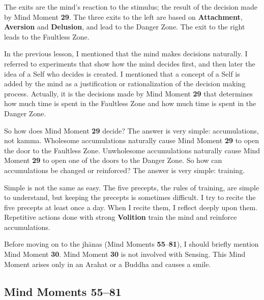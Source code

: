 The exits are the mind’s reaction to the stimulus; the result of the decision made by Mind Moment \textbf{29}. The three exits to the left are based on \textbf{Attachment}, \textbf{Aversion} and \textbf{Delusion}, and lead to the Danger Zone. The exit to the right leads to the Faultless Zone.

In the previous lesson, I mentioned that the mind makes decisions naturally. I referred to experiments that show how the mind decides first, and then later the idea of a Self who decides is created. I mentioned that a concept of a Self is added by the mind as a justification or rationalization of the decision making process. Actually, it is the decisions made by Mind Moment \textbf{29} that determines how much time is spent in the Faultless Zone and how much time is spent in the Danger Zone.

So how does Mind Moment \textbf{29} decide? The answer is very simple: accumulations, not kamma. Wholesome accumulations naturally cause Mind Moment \textbf{29} to open the door to the Faultless Zone. Unwholesome accumulations naturally cause Mind Moment \textbf{29} to open one of the doors to the Danger Zone. So how can accumulations be changed or reinforced? The answer is very simple: training.

Simple is not the same as easy. The five precepts, the rules of training, are simple to understand, but keeping the precepts is sometimes difficult. I try to recite the five precepts at least once a day. When I recite them, I reflect deeply upon them. Repetitive actions done with strong \textbf{Volition} train the mind and reinforce accumulations.

Before moving on to the jhānas (Mind Moments \textbf{55}--\textbf{81}), I should briefly mention Mind Moment \textbf{30}. Mind Moment \textbf{30} is not involved with Sensing. This Mind Moment arises only in an Arahat or a Buddha and causes a smile. 

\pagebreak

\subsection*{Mind Moments 55--81}

